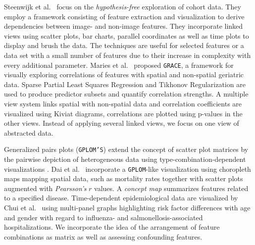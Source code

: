 \documentclass[journal]{style/vgtc} 			          %
\begin{document}
Steenwijk et al.~\cite{Steenwijk} focus on the \emph{hypothesis-free} exploration of cohort data.
They employ a framework consisting of feature extraction and visualization to derive dependencies between image- and non-image features.
They incorporate linked views using scatter plots, bar charts, parallel coordinates as well as time plots to display and brush the data.
The techniques are useful for selected features or a data set with a small number of features due to their increase in complexity with every additional parameter.
Maries et al.~\cite{GRACE} proposed \texttt{GRACE}, a framework for visually exploring correlations of features with spatial and non-spatial geriatric data.
Sparse Partial Least Squares Regression and Tikhonov Regularization are used to produce predictor subsets and quantify correlation strengths.
A multiple view system links spatial with non-spatial data and correlation coefficients are visualized using Kiviat diagrams, correlations are plotted using p-values in the other views.
Instead of applying several linked views, we focus on one view of abstracted data.

Generalized pairs plots (\texttt{GPLOM'S}) extend the concept of scatter plot matrices by the pairwise depiction of heterogeneous data using type-combination-dependent visualizations \cite{GPLOMS, Francois2013}.
Dai et al.~\cite{Dai2005} incorporate a \texttt{GPLOM}-like visualization using choropleth maps mapping spatial data, such as mortality rates together with scatter plots augmented with \emph{Pearsson's} $r$ values.
A \emph{concept map} summarizes features related to a specified disease.
Time-dependent epidemiological data are visualized by Chui et al.~\cite{Chui2011} using multi-panel graphs highlighting risk factor differences with age and gender with regard to influenza- and salmonellosis-associated hospitalizations.
We incorporate the idea of the arrangement of feature combinations as matrix as well as assessing confounding features.
\end{document}

